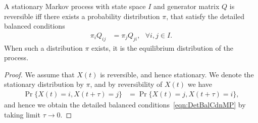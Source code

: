 \documentclass[a4paper,10pt,english]{article}
\begin{document}
\begin{thm} A stationary Markov process with state space $I$ and generator matrix $Q$ is reversible iff there exists a probability distribution $\pi$, that satisfy the detailed balanced conditions
\begin{align}
\label{eqn:DetBalCdnMP}
\pi_iQ_{ij} &= \pi_jQ_{ji},~~~ \forall i,j \in I.
\end{align}
When such a distribution $\pi$ exists, it is the equilibrium distribution of the process.
\end{thm}
\begin{proof} We assume that $X(t)$ is reversible, and hence stationary. We denote the stationary distribution by $\pi$, and by reversibility of $X(t)$ we have
\begin{align*}
\Pr\{X(t) = i , X(t+\tau) = j\} &= \Pr\{X(t) = j, X(t+\tau) = i\},
\end{align*}
and hence we obtain the detailed balanced conditions~\eqref{eqn:DetBalCdnMP} by taking limit $\tau \to 0$. 


\end{proof}
\end{document}
